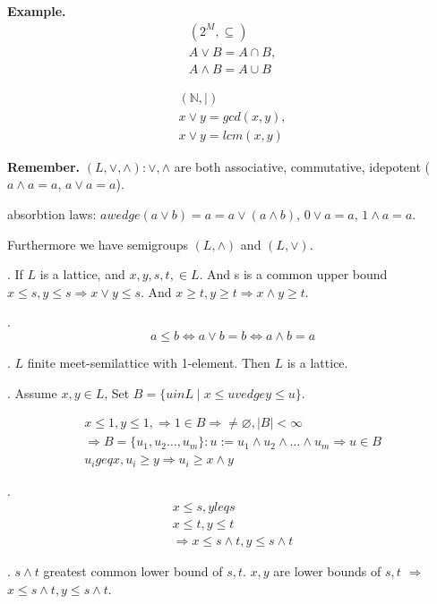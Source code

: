 \textbf{Example.}
\begin{align*}
    (2^M, \subseteq) \\
    A\vee B = A \cap B, \\
    A\wedge B = A \cup B
\end{align*}

\begin{align*}
    (\mathbb{N}, \mid) \\
    x \vee y = gcd(x,y), \\
    x \vee y = lcm(x,y)
\end{align*}

\textbf{Remember.}
$(L, \vee, \wedge): \vee, \wedge$ are both associative, commutative, idepotent ($a\wedge a = a$, $a\vee a = a$). 

absorbtion laws: $a wedge(a \vee b) = a = a \vee ( a \wedge b)$, $0 \vee a = a$, $1 \wedge a = a$. 

Furthermore we have semigroups $(L, \wedge)$ and $(L, \vee)$.

\Lemma.
If $L$ is a lattice, and $x,y,s,t, \in L$. And s is a common upper bound $x \leq s, y \leq s \Rightarrow x \vee y \leq s$. 
And $x \geq t, y \geq t \Rightarrow x \wedge y \geq t$. 

\Remark.
\[
    a \leq b \Leftrightarrow a \vee b = b \Leftrightarrow a \wedge b = a
\]

\Lemma.
$L$ finite meet-semilattice with 1-element. Then $L$ is a lattice.

\Proof.
Assume $x,y \in L$, Set $B = \{u in L \mid x \leq u vedge y \leq u\}$. 

\begin{align*}
    x \leq 1, y \leq 1, 
        \Rightarrow 1 \in B \Rightarrow \neq \varnothing, |B| < \infty \\
    \Rightarrow B= \{u_1, u_2 \ldots , u_m\}: 
        u:= u_1 \wedge u_2 \wedge \ldots \wedge u_m 
    \Rightarrow u \in B \\
    u_i geq x, u_i \geq y \Rightarrow u_i \geq x \wedge y
\end{align*}


\Lemma.
\begin{align*}
    x \leq s, y leq s \\
    x \leq t, y \leq t \\
    \Rightarrow x \leq s \wedge t, y \leq s \wedge t
\end{align*}

\Proof.
$s \wedge t$ greatest common lower bound of $s,t$. 
$x,y$ are lower bounds of $s,t$ $\Rightarrow$ $x \leq s \wedge t, y \leq s \wedge t$. 

